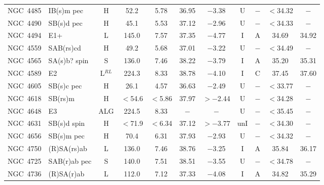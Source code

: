 \begin{center}
\begin{longtable}{lC{2.5cm}ccccccccc}
NGC~4485 & IB(s)m pec     & H           & 52.2  & 5.78                & 36.95    & $-$3.38    & U   &$-$        & $<$34.32 &  $-$          \\
NGC~4490 & SB(s)d pec      & H          & 45.1  & 5.53                 & 37.12    & $-$2.96   & U   &$-$       & $<$34.33 & $-$            \\
NGC~4494 & E1+             & L           & 145.0   & 7.57               & 37.35    & $-$4.77    & I   & A        & 34.69    & 34.92         \\
NGC~4559 & SAB(rs)cd        & H                 & 49.2  & 5.68               & 37.01    & $-$3.22      & U   &$-$      & $<$34.49 & $-$             \\
NGC~4565 & SA(s)b? spin     & S                 & 136.0   & 7.46               & 38.22    & $-$3.79    & I   & A       & 35.20    & 35.31          \\
NGC~4589 & E2               & L$^{RL}$                  & 224.3 & 8.33               & 38.78    & $-$4.10    & I   & C       & 37.45    & 37.60          \\
NGC~4605 & SB(s)c pec       & H                 & 26.1  & 4.57               & 36.63    & $-$2.49      & U   &$-$      & $<$33.77 & $-$             \\
NGC~4618 & SB(rs)m           & H                 & $<$54.6 & $<$5.86          & 37.97    & $>-$2.44     & U   &$-$   & $<$34.28 & $-$             \\
NGC~4648 & E3                & ALG               & 224.5 & 8.33                & $-$      & $-$       & U   &$-$      & $<$35.45 & $-$             \\
NGC~4631 & SB(s)d spin       & H                 & $<$71.9 & $<$6.34         & 37.12    & $>-$3.77        & unI &$-$        & $<$34.30 & $-$        \\
NGC~4656 & SB(s)m pec        & H                 & 70.4  & 6.31                & 37.93    & $-$2.93      & U   &$-$      & $<$34.32 & $-$             \\
NGC~4750 & (R)SA(rs)ab      & L                 & 136.0   & 7.46                 & 38.76    & $-$3.25      & I   & A       & 35.84    & 36.17          \\
NGC~4725 & SAB(r)ab pec      & S                 & 140.0   & 7.51                & 38.51    & $-$3.55       & U   &$-$      & $<$34.78 & $-$             \\
NGC~4736 & (R)SA(r)ab        &  L         & 112.0   & 7.12               & 37.33    & $-$4.08        & I   & A        & 34.82    & 35.29        \\

\end{longtable}
\end{center}
